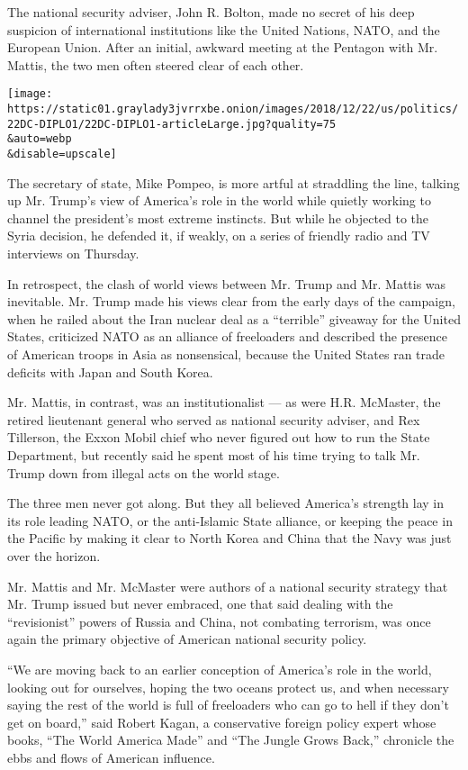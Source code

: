 The national security adviser, John R. Bolton, made no secret of his
deep suspicion of international institutions like the United Nations,
NATO, and the European Union. After an initial, awkward meeting at the
Pentagon with Mr. Mattis, the two men often steered clear of each other.

\texttt{[image: https://static01.graylady3jvrrxbe.onion/images/2018/12/22/us/politics/22DC-DIPLO1/22DC-DIPLO1-articleLarge.jpg?quality=75\\\&auto=webp\\\&disable=upscale]}

The secretary of state, Mike Pompeo, is more artful at straddling the
line, talking up Mr. Trump's view of America's role in the world while
quietly working to channel the president's most extreme instincts. But
while he objected to the Syria decision, he defended it, if weakly, on a
series of friendly radio and TV interviews on Thursday.

In retrospect, the clash of world views between Mr. Trump and Mr. Mattis
was inevitable. Mr. Trump made his views clear from the early days of
the campaign, when he railed about the Iran nuclear deal as a
``terrible'' giveaway for the United States, criticized NATO as an
alliance of freeloaders and described the presence of American troops in
Asia as nonsensical, because the United States ran trade deficits with
Japan and South Korea.

Mr. Mattis, in contrast, was an institutionalist --- as were H.R.
McMaster, the retired lieutenant general who served as national security
adviser, and Rex Tillerson, the Exxon Mobil chief who never figured out
how to run the State Department, but recently said he spent most of his
time trying to talk Mr. Trump down from illegal acts on the world stage.

The three men never got along. But they all believed America's strength
lay in its role leading NATO, or the anti-Islamic State alliance, or
keeping the peace in the Pacific by making it clear to North Korea and
China that the Navy was just over the horizon.

Mr. Mattis and Mr. McMaster were authors of a national security strategy
that Mr. Trump issued but never embraced, one that said dealing with the
``revisionist'' powers of Russia and China, not combating terrorism, was
once again the primary objective of American national security policy.

``We are moving back to an earlier conception of America's role in the
world, looking out for ourselves, hoping the two oceans protect us, and
when necessary saying the rest of the world is full of freeloaders who
can go to hell if they don't get on board,'' said Robert Kagan, a
conservative foreign policy expert whose books, ``The World America
Made'' and ``The Jungle Grows Back,'' chronicle the ebbs and flows of
American influence.

